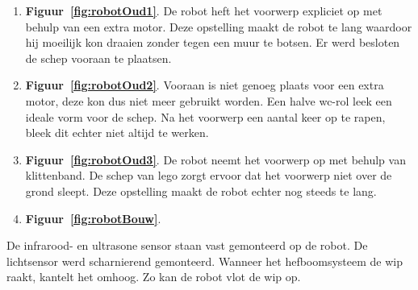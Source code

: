 \documentclass[tt3]{penoverslag}
\begin{document}
\begin{enumerate}
\item \textbf{Figuur~\ref{fig:robotOud1}}. De robot heft het voorwerp expliciet op met behulp van een extra motor. Deze opstelling maakt de robot te lang waardoor hij moeilijk kon draaien zonder tegen een muur te botsen. Er werd besloten de schep vooraan te plaatsen.
\item \textbf{Figuur~\ref{fig:robotOud2}}. Vooraan is niet genoeg plaats voor een extra motor, deze kon dus niet meer gebruikt worden. Een halve wc-rol leek een ideale vorm voor de schep. Na het voorwerp een aantal keer op te rapen, bleek dit echter niet altijd te werken.
\item \textbf{Figuur~\ref{fig:robotOud3}}. De robot neemt het voorwerp op met behulp van klittenband. De schep van lego zorgt ervoor dat het voorwerp niet over de grond sleept. Deze opstelling maakt de robot echter nog steeds te lang.
\item \textbf{Figuur~\ref{fig:robotBouw}}. %
\end{enumerate}

De infrarood- en ultrasone sensor staan vast gemonteerd op de robot. De lichtsensor werd scharnierend gemonteerd. Wanneer het hefboomsysteem de wip raakt, kantelt het omhoog. Zo kan de robot vlot de wip op.

\end{document}
